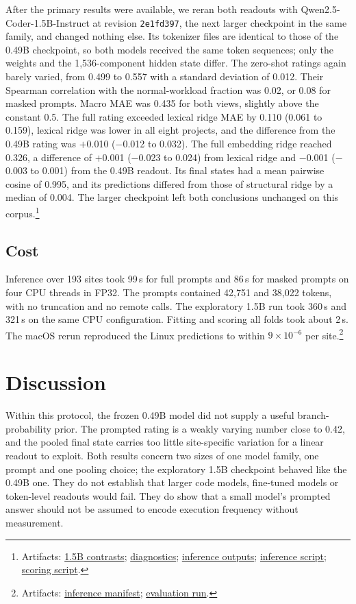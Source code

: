 \documentclass[11pt]{article}
\newcommand{\repocommit}{81d03caebe268d013b3163bcbff31cadabaaec21}
\newcommand{\repourl}{https://github.com/minggu151623/llm_profiling_research}
\newcommand{\repo}[2]{\href{\repourl/blob/\repocommit/#1}{#2}}
\newcommand{\artifacts}[1]{\footnote{Artifacts: #1.}}
\begin{document}
After the primary results were available, we reran both readouts with Qwen2.5-Coder-1.5B-Instruct at revision \texttt{2e1fd397}, the next larger checkpoint in the same family, and changed nothing else. Its tokenizer files are identical to those of the 0.49B checkpoint, so both models received the same token sequences; only the weights and the 1,536-component hidden state differ. The zero-shot ratings again barely varied, from 0.499 to 0.557 with a standard deviation of 0.012. Their Spearman correlation with the normal-workload fraction was 0.02, or 0.08 for masked prompts. Macro MAE was 0.435 for both views, slightly above the constant 0.5. The full rating exceeded lexical ridge MAE by 0.110 (0.061 to 0.159), lexical ridge was lower in all eight projects, and the difference from the 0.49B rating was $+$0.010 ($-$0.012 to 0.032). The full embedding ridge reached 0.326, a difference of $+$0.001 ($-$0.023 to 0.024) from lexical ridge and $-$0.001 ($-$0.003 to 0.001) from the 0.49B readout. Its final states had a mean pairwise cosine of 0.995, and its predictions differed from those of structural ridge by a median of 0.004. The larger checkpoint left both conclusions unchanged on this corpus.\artifacts{\repo{experiments/study/supplement/scale.csv}{1.5B contrasts}; \repo{experiments/study/supplement/scale_summary.json}{diagnostics}; \repo{experiments/study/supplement/qwen-1.5b}{inference outputs}; \repo{ml/slm/scale.py}{inference script}; \repo{ml/scale.py}{scoring script}}

\subsection{Cost}

Inference over 193 sites took 99\,s for full prompts and 86\,s for masked prompts on four CPU threads in FP32. The prompts contained 42,751 and 38,022 tokens, with no truncation and no remote calls. The exploratory 1.5B run took 360\,s and 321\,s on the same CPU configuration. Fitting and scoring all folds took about 2\,s. The macOS rerun reproduced the Linux predictions to within $9 \times 10^{-6}$ per site.\artifacts{\repo{experiments/study/slm/manifest.json}{inference manifest}; \repo{experiments/study/evaluation/run.json}{evaluation run}}

\section{Discussion}

Within this protocol, the frozen 0.49B model did not supply a useful branch-probability prior. The prompted rating is a weakly varying number close to 0.42, and the pooled final state carries too little site-specific variation for a linear readout to exploit. Both results concern two sizes of one model family, one prompt and one pooling choice; the exploratory 1.5B checkpoint behaved like the 0.49B one. They do not establish that larger code models, fine-tuned models or token-level readouts would fail. They do show that a small model's prompted answer should not be assumed to encode execution frequency without measurement.
\end{document}
